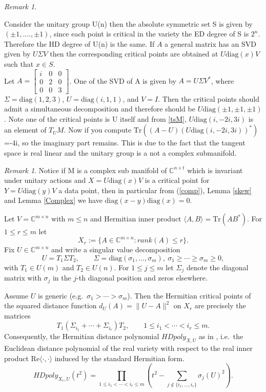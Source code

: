 \documentclass[11pt]{amsart}
\def\C{\mathbb C}\let\ce\C
\theoremstyle{plain}
\theoremstyle{definition}
\theoremstyle{remark}
\newtheorem{remark}[theorem]{Remark}
\begin{document}
\begin{remark} \label{unit}
    

Consider the unitary group U(n) then the absolute symmetric set S is given by $(\pm 1,....,\pm 1)$, since each point is critical in the variety the ED degree of S is $2^n$. Therefore the HD degree of U(n) is the same. If $A$ a general matrix has an SVD given by $U\Sigma V$ then the corresponding critical points are obtained at $U\mathrm{diag}(x)V$ such that $x \in S$.\\ Let
$A = \begin{bmatrix}
i & 0 & 0 \\
0 & 2 & 0 \\
0 & 0 & 3
\end{bmatrix}$.
One of the SVD of A is given by
$A = U \Sigma V^*$,
where
$\Sigma = \mathrm{diag}(1,2,3)$, 
$U = \mathrm{diag}(i,1,1)$, 
and $V = I$. Then the critical points should admit a simultaneous decomposition and therefore should be $U\mathrm{diag}(\pm1,\pm1,\pm1)$. Note one of the critical points is U itself and from \ref{tsM}, $U\mathrm{diag}(i,-2i,3i)$ is an element of $T_UM$. Now if you compute $\mathrm{Tr}((A-U)(U\mathrm{diag}(i,-2i,3i))^*)$=-4i, so the imaginary part remains. This is due to the fact that the tangent space is real linear and the unitary group is a not a complex submanifold.
\end{remark}

\begin{remark}
    Notice if M is a complex sub manifold of $\mathbb{C}^{n \times t}$  which is invariant under unitary actions and $X=U\mathrm{diag}(x)V$ is a critical point for $Y=U\mathrm{diag}(y)V$ a data point, then in particular from (\ref{comp}), Lemma \ref{skew} and Lemma \ref{Complex}  we have $\mathrm{diag}(x-y)\mathrm{diag}(x)=0$. 
    
\end{remark}




Let $V=\C^{m\times n}$ with $m\le n$ and Hermitian inner product
$\langle A,B\rangle=\mathrm{Tr}(AB^*)$.
For $1\le r\le m$ let
\[
X_r:=\{A\in \C^{m\times n}:rank(A)\le r\}.
\]
Fix $U\in \C^{m\times n}$ and write a singular value decomposition
\[
U=T_1\Sigma T_2,\qquad \Sigma=\mathrm{diag}(\sigma_1,\dots,\sigma_m),\ \sigma_1\ge\cdots\ge\sigma_m\ge0,
\]
with $T_1\in U(m)$ and $T_2\in U(n)$.
For $1\le j\le m$ let $\Sigma_j$ denote the diagonal matrix with $\sigma_j$ in the $j$-th
diagonal position and zeros elsewhere.

Assume $U$ is generic (e.g.\ $\sigma_1>\cdots>\sigma_m$). Then the Hermitian critical points of the
squared distance function $d_U(A)=\|U-A\|^2$ on $X_r$ are precisely the matrices
\[
T_1(\Sigma_{i_1}+\cdots+\Sigma_{i_r})T_2,
\qquad 1\le i_1<\cdots<i_r\le m.
\]
Consequently, the Hermitian distance polynomial $HDpoly_{X,U}$ as in \cite{Furchi2025_HermitianDistanceDegree}, i.e.\ the Euclidean
distance polynomial of the real variety with respect to the real inner product
$\mathrm{Re}\langle\cdot,\cdot\rangle$ induced by the standard Hermitian form.
\[
HDpoly_{X_r,U}(t^2)
=
\prod_{1\le i_1<\cdots<i_r\le m}
\left(t^2-\sum_{j\notin\{i_1,\dots,i_r\}}\sigma_j(U)^2\right).
\]
\end{document}
